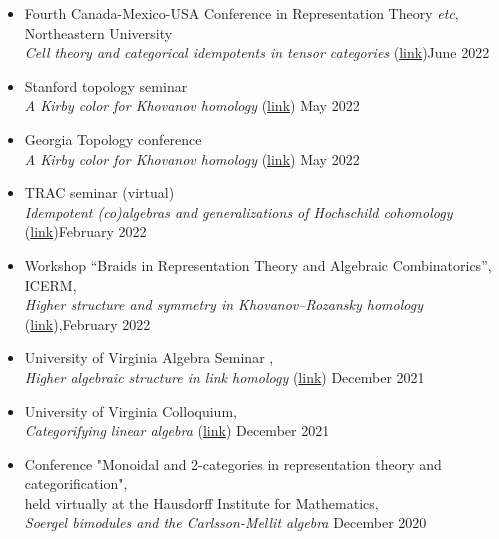 \documentclass[12pt]{amsart}
\renewcommand{\j}{\indent}
\begin{document}
\begin{itemize}
\item[$\cdot$] Fourth Canada-Mexico-USA Conference in Representation Theory \emph{etc}, Northeastern University\\ \j
\emph{Cell theory and categorical idempotents in tensor categories} (\href{https://sites.google.com/view/canadausmexico-2022/home?authuser=0}{link})\hfill June 2022


\item[$\cdot$] Stanford topology seminar\\ \j \emph{A Kirby color for Khovanov homology} (\href{https://mathematics.stanford.edu/events/kirby-color-khovanov-homology}{link}) \hfill May 2022

\item[$\cdot$] Georgia Topology conference\\ \j\emph{A Kirby color for Khovanov homology} (\href{https://topology.franklinresearch.uga.edu/2022GTC}{link}) \hfill May 2022

\item[$\cdot$] TRAC seminar (virtual)\\
\j \emph{Idempotent (co)algebras and generalizations of Hochschild cohomology} (\href{zhttps://researchseminars.org/seminar/TRAC}{link})\hfill February 2022

\item[$\cdot$] Workshop ``Braids in Representation Theory and Algebraic Combinatorics'', ICERM,\\
\j\emph{Higher structure and symmetry in Khovanov--Rozansky homology} (\href{https://icerm.brown.edu/program/semester_program_workshop/sp-s22-w1}{link}),\hfill February 2022

\item[$\cdot$]  University of Virginia Algebra Seminar ,\\
\j \emph{Higher algebraic structure in link homology} (\href{https://math.virginia.edu/seminars/algebra/2021-22/}{link}) \hfill December 2021


\item[$\cdot$]University of Virginia Colloquium,\\
\j \emph{Categorifying linear algebra} (\href{https://math.virginia.edu/seminars/colloq/2021-22/}{link}) \hfill December 2021


\item[$\cdot$] Conference "Monoidal and 2-categories in representation theory and categorification",\\
\j held virtually at the Hausdorff Institute for Mathematics,\\
\j \emph{Soergel bimodules and the Carlsson-Mellit algebra} \hfill December 2020 




\end{itemize}
\end{document}
